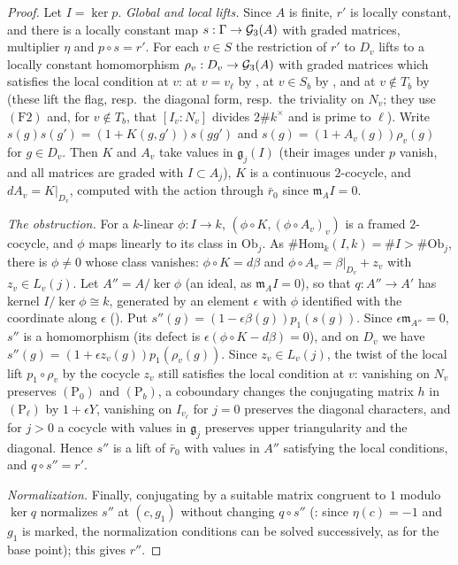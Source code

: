 \begin{proof}
Let $I=\ker p$. \emph{Global and local lifts.} Since $A$ is finite, $r'$ is locally constant, and there is a locally constant map
$s:\Gamma\to\mathcal G_3(A)$ with graded matrices, multiplier $\eta$ and $p\circ s=r'$. For each $v\in S$ the restriction of $r'$ to $D_v$ lifts to a
locally constant homomorphism $\rho_v:D_v\to\mathcal G_3(A)$ with graded matrices which satisfies the local condition at $v$: at
$v=v_\ell$ by , at $v\in S_b$ by
, and at $v\notin T_b$ by
 (these lift the flag, resp.\ the diagonal form, resp.\ the triviality on
$N_v$; they use $(\mathrm{F2})$ and, for $v\notin T_b$, that $[I_v:N_v]$ divides $2\#k^\times$ and is prime to $\ell$). Write
$s(g)s(g')=(1+K(g,g'))s(gg')$ and $s(g)=(1+A_v(g))\rho_v(g)$ for $g\in D_v$. Then $K$ and $A_v$ take values in $\mathfrak g_j(I)$
(their images under $p$ vanish, and all matrices are graded with $I\subset A_j$), $K$ is a continuous $2$-cocycle, and
$dA_v=K|_{D_v}$, computed with the action through $\bar r_0$ since $\mathfrak m_AI=0$.

\emph{The obstruction.} For a $k$-linear $\phi:I\to k$, $(\phi\circ K,(\phi\circ A_v)_v)$ is a framed $2$-cocycle, and $\phi$ maps linearly
to its class in $\mathrm{Ob}_j$. As $\#\mathrm{Hom}_k(I,k)=\#I>\#\mathrm{Ob}_j$, there is $\phi\ne0$ whose class vanishes:
$\phi\circ K=d\beta$ and $\phi\circ A_v=\beta|_{D_v}+z_v$ with $z_v\in L_v(j)$. Let $A''=A/\ker\phi$ (an ideal, as $\mathfrak m_AI=0$), so that $q:A''\to A'$
has kernel $I/\ker\phi\cong k$, generated by an element $\epsilon$ with $\phi$ identified with the coordinate along $\epsilon$
(). Put $s''(g)=(1-\epsilon\beta(g))p_1(s(g))$. Since
$\epsilon\mathfrak m_{A''}=0$, $s''$ is a homomorphism (its defect is $\epsilon(\phi\circ K-d\beta)=0$), and on $D_v$ we have
$s''(g)=(1+\epsilon z_v(g))p_1(\rho_v(g))$. Since $z_v\in L_v(j)$, the twist of the local lift $p_1\circ\rho_v$ by the cocycle $z_v$ still
satisfies the local condition at $v$: vanishing on $N_v$ preserves $(\mathrm P_0)$ and $(\mathrm P_b)$, a coboundary changes the
conjugating matrix $h$ in $(\mathrm P_\ell)$ by $1+\epsilon Y$, vanishing on $I_{v_\ell}$ for $j=0$ preserves the diagonal characters, and for
$j>0$ a cocycle with values in $\mathfrak g_j$ preserves upper triangularity and the diagonal. Hence $s''$ is a lift of $\bar r_0$ with
values in $A''$ satisfying the local conditions, and $q\circ s''=r'$.

\emph{Normalization.} Finally, conjugating by a suitable matrix congruent to $1$ modulo $\ker q$ normalizes $s''$ at $(c,g_1)$
without changing $q\circ s''$ (: since $\eta(c)=-1$ and $g_1$ is marked, the
normalization conditions can be solved successively, as for the base point); this gives $r''$.
\end{proof}


